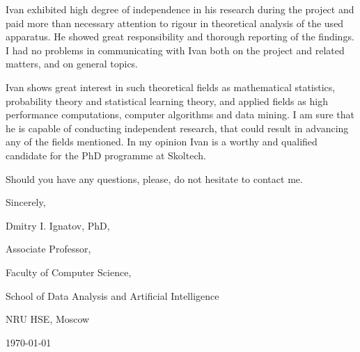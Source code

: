 \documentclass[14pt]{extarticle}
\begin{document}
Ivan exhibited high degree of independence in his research during the project and
paid more than necessary attention to rigour in theoretical analysis of the used
apparatus. He showed great responsibility and thorough reporting of the findings.
I had no problems in communicating with Ivan both on the project and related matters,
and on general topics. \par\medskip

Ivan shows great interest in such theoretical fields as mathematical statistics,
probability theory and statistical learning theory, and applied fields as high performance
computations, computer algorithms and data mining. I am sure that he is capable of
conducting independent research, that could result in advancing any of the fields
mentioned. In my opinion Ivan is a worthy and qualified candidate for the PhD programme
at Skoltech. \par\medskip

Should you have any questions, please, do not hesitate to contact me. \par\bigskip

Sincerely, \par \medskip

Dmitry I. Ignatov, PhD, \par
Associate Professor, \par
Faculty of Computer Science, \par
School of Data Analysis and Artificial Intelligence \par
NRU HSE, Moscow \par
\hfill\today
\end{document}
